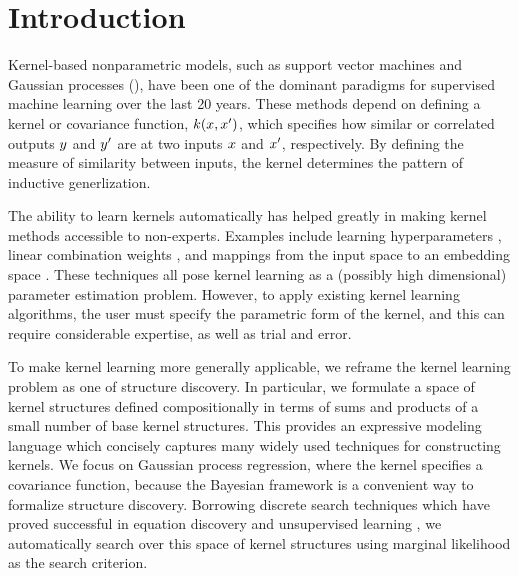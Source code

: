 \documentclass[twoside]{article}
\begin{document}
\section{Introduction}

Kernel-based nonparametric models, such as support vector machines and Gaussian processes (\gp{}), have been one of the dominant paradigms for supervised machine learning over the last 20 years.
These methods depend on defining a kernel or covariance function, $k(x,x')$, which specifies how similar or correlated outputs $y$ and $y'$ are at two inputs $x$ and $x'$, respectively.
By defining the measure of similarity between inputs, the kernel determines the pattern of inductive generlization.

The ability to learn kernels automatically has helped greatly in making kernel methods accessible to non-experts.
Examples include learning hyperparameters , linear combination weights \cite{Back_HKL}, and mappings from the input space to an embedding space \cite{salakhutdinov2008using}.
These techniques all pose kernel learning as a (possibly high dimensional) parameter estimation problem.
However, to apply existing kernel learning algorithms, the user must specify the parametric form of the kernel, and this can require considerable expertise, as well as trial and error.

To make kernel learning more generally applicable, we reframe the kernel learning problem as one of structure discovery.
In particular, we formulate a space of kernel structures defined compositionally in terms of sums and products of a small number of base kernel structures.
This provides an expressive modeling language which concisely captures many widely used techniques for constructing kernels.
We focus on Gaussian process regression, where the kernel specifies a covariance function, because the Bayesian framework is a convenient way to formalize structure discovery.
Borrowing discrete search techniques which have proved successful in equation discovery \cite{todorovski1997declarative} and unsupervised learning \cite{grosse2012exploiting}, we automatically search over this space of kernel structures using marginal likelihood as the search criterion.
\end{document}
